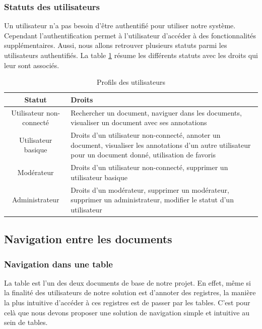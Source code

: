 \documentclass[a4paper]{article}
\begin{document}
\subsubsection{Statuts des utilisateurs}

Un utilisateur n'a pas besoin d'être authentifié pour utiliser notre système. Cependant l'authentification permet à l'utilisateur d'accéder à des fonctionnalités supplémentaires. Aussi, nous allons retrouver plusieurs statuts parmi les utilisateurs authentifiés. La table \ref{tab:profils} résume les différents statuts avec les droits qui leur sont associés. 

\begin{table}[H]
	\centering
		\small
			\begin{tabular}{|c|p{7cm}|}
				\hline
					\rowcolor{lightgray}\textbf{Statut} & \textbf{Droits} \\
				\hline
					Utilisateur non-connecté & Rechercher un document, naviguer dans les documents, visualiser un document avec ses annotations \\
				\hline
					Utilisateur basique & Droits d'un utilisateur non-connecté, annoter un document, visualiser les annotations d'un autre utilisateur pour un document donné, utilisation de favoris \\
				\hline
					Modérateur & Droits d'un utilisateur non-connecté, supprimer un utilisateur basique\\
				\hline
					Administrateur & Droits d'un modérateur, supprimer un modérateur, supprimer un administrateur, modifier le statut d'un utilisateur \\
				\hline
			\end{tabular}
			\caption{Profils des utilisateurs}
		\normalsize
	\label{tab:profils}
\end{table}


\subsection{Navigation entre les documents}

\subsubsection{Navigation dans une table}

La table est l'un des deux documents de base de notre projet. En effet, même si la finalité des utilisateurs de notre solution est d'annoter des registres, la manière la plus intuitive d'accéder à ces registres est de passer par les tables. C'est pour celà que nous devons proposer une solution de navigation simple et intuitive au sein de tables.
\end{document}
